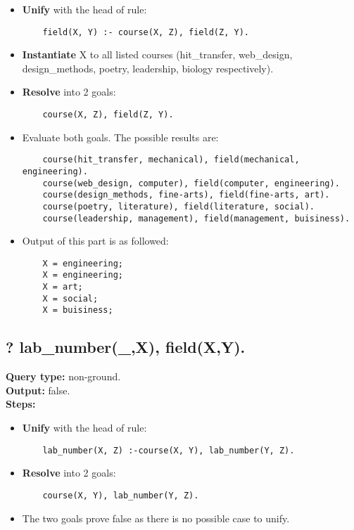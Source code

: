 \begin{itemize}
    \item \textbf{Unify} with the head of rule:
    \begin{lstlisting}
    field(X, Y) :- course(X, Z), field(Z, Y).
    \end{lstlisting}
\item \textbf{Instantiate} X to all listed courses (hit\_transfer, web\_design, design\_methods, poetry, leadership, biology respectively).
\item \textbf{Resolve} into 2 goals:
    \begin{lstlisting}
    course(X, Z), field(Z, Y).
    \end{lstlisting}
\item Evaluate both goals. The possible results are:
    \begin{lstlisting}
    course(hit_transfer, mechanical), field(mechanical, engineering). 
    course(web_design, computer), field(computer, engineering).
    course(design_methods, fine-arts), field(fine-arts, art).
    course(poetry, literature), field(literature, social).
    course(leadership, management), field(management, buisiness).
    \end{lstlisting}
\item Output of this part is as followed:
    \begin{lstlisting}
    X = engineering;
    X = engineering;
    X = art;
    X = social;
    X = buisiness;
    \end{lstlisting}
\end{itemize}


\subsection{? lab\_number(\_,X), field(X,Y).}
\textbf{Query type: } non-ground. \\
\textbf{Output:} false. \\
\textbf{Steps:}
\begin{itemize}
    \item \textbf{Unify} with the head of rule:
    \begin{lstlisting}
    lab_number(X, Z) :-course(X, Y), lab_number(Y, Z).
    \end{lstlisting}
    \item \textbf{Resolve} into 2 goals:
    \begin{lstlisting}
    course(X, Y), lab_number(Y, Z).
    \end{lstlisting}
    \item The two goals prove false as there is no possible case to unify.  
\end{itemize}


